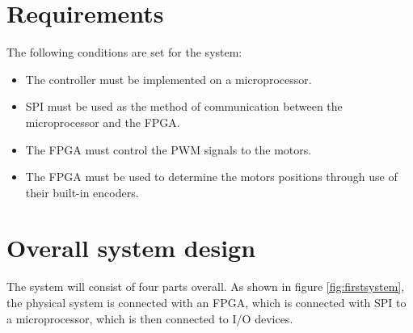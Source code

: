 \pagebreak
\section{Requirements}
The following conditions are set for the system:
\begin{itemize}
\item The controller must be implemented on a microprocessor.
\item SPI must be used as the method of communication between the microprocessor and the FPGA.
\item The FPGA must control the PWM signals to the motors.
\item The FPGA must be used to determine the motors positions through use of  their built-in encoders.
\end{itemize}



\section{Overall system design}
The system will consist of four parts overall. As shown in figure \ref{fig:firstsystem}, the physical system is connected with an FPGA, which is connected with SPI to a microprocessor,  which is then connected to I/O devices.

